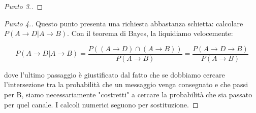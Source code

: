 \documentclass{beamer}
\renewcommand\qedsymbol{$\blacksquare$}
\begin{document}
\begin{frame}
\begin{proof}[Punto 3.]
	\end{proof}
\end{frame}
\renewcommand\qedsymbol{$\blacksquare$}


\begin{frame}
	\begin{proof}[Punto 4.]
		Questo punto presenta una richiesta abbastanza schietta: calcolare $P(A \rightarrow D|A \rightarrow B)$. Con il teorema di Bayes, la liquidiamo velocemente:

		\[
			P(A \rightarrow D|A \rightarrow B) = \frac{P((A \rightarrow D) \cap (A \rightarrow B))}{P(A \rightarrow B)} = \frac{P(A \rightarrow D \rightarrow B)}{P(A \rightarrow B)}
		\]

		dove l'ultimo passaggio è giustificato dal fatto che se dobbiamo cercare l'intersezione tra la probabilità che un messaggio venga consegnato e che passi per B, siamo necessariamente "costretti" a cercare la probabilità che sia passato per quel canale. I calcoli numerici seguono per sostituzione. \qedhere
	\end{proof}
\end{frame}
\end{document}
